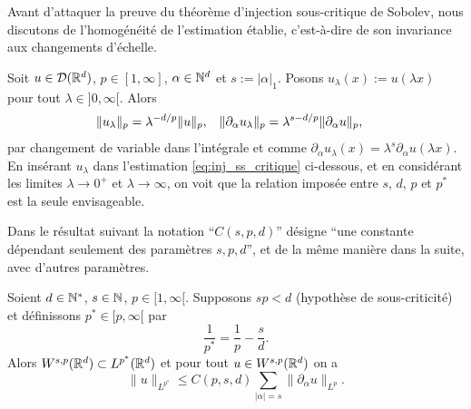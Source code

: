 Avant d'attaquer la preuve du théorème d'injection sous-critique de Sobolev, nous discutons de l'homogénéité de l'estimation établie, c'est-à-dire de son invariance aux changements d'échelle. 
\begin{remark}[Homogénéité]
\label{rem:homogSobolev}
Soit $u \in \mathcal{D}(\mathbb{R}^d)$, $p \in [1,\infty]$,  $\alpha \in \mathbb{N}^d$ et $s := |\alpha|_1$. Posons 
$u_\lambda(x) := u(\lambda x)$ pour tout $\lambda\in ]0,\infty[$. Alors
\begin{align}
\label{eq:homog_lp}
	\|u_\lambda\|_{p} &= \lambda^{-d/p} \|u\|_p, &
	\|\partial_\alpha u_\lambda\|_p &= \lambda^{s-d/p}\|\partial_\alpha u\|_p,
\leancheck{eq:homog_lp}%
\end{align}
	par changement de variable dans l'intégrale et comme $\partial_\alpha u_\lambda (x) = \lambda^s \partial_\alpha u(\lambda x)$. 
	En insérant $u_\lambda$ dans l'estimation \eqref{eq:inj_ss_critique} ci-dessous, et en considérant les limites $\lambda\to 0^+$ et $\lambda\to \infty$, on voit que la relation imposée entre $s$, $d$, $p$ et $p^*$ est la seule envisageable.
\end{remark}

Dans le résultat suivant la notation ``$C(s,p,d)$'' désigne ``une constante dépendant seulement des paramètres $s,p,d$'', et de la même manière dans la suite, avec d'autres paramètres.

\begin{theorem}
\label{th:injSousCrit}
%
	Soient $d\in \mathbb{N}^*$, $s\in \mathbb{N}$, $p \in [1,\infty[$. Supposons $s p<d$ (hypothèse de sous-criticité) et définissons $p^* \in [p,\infty[$ par 
	\begin{equation*}	
	\frac 1 {p^*} = \frac 1 p - \frac s d.
	\end{equation*}
	Alors $W^{s,p}(\mathbb{R}^d) \subset L^{p^*}(\mathbb{R}^d)$ et pour tout $u \in W^{s,p}(\mathbb{R}^d)$ on a 
	\begin{equation}
	\label{eq:inj_ss_critique}
		\|u\|_{L^{p^*}} \leq C(p,s,d) \sum_{|\alpha| = s} \|\partial_\alpha u\|_{L^p}.
	\end{equation}
\end{theorem}

